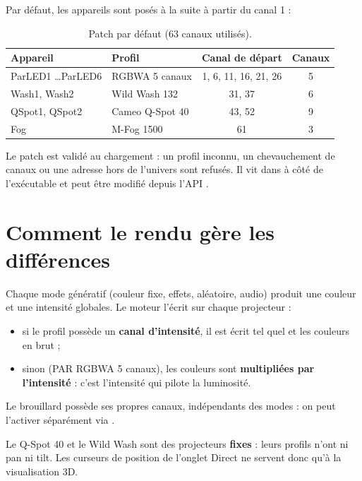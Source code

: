 Par défaut, les appareils sont posés à la suite à partir du canal 1 :

\begin{table}[H]
  \centering
  \begin{tabular}{@{}llcc@{}}
    \toprule
    \textbf{Appareil} & \textbf{Profil} & \textbf{Canal de départ} & \textbf{Canaux} \\
    \midrule
    ParLED1 \dots ParLED6 & RGBWA 5 canaux & 1, 6, 11, 16, 21, 26 & 5 \\
    Wash1, Wash2 & Wild Wash 132 & 31, 37 & 6 \\
    QSpot1, QSpot2 & Cameo Q-Spot 40 & 43, 52 & 9 \\
    Fog & M-Fog 1500 & 61 & 3 \\
    \bottomrule
  \end{tabular}
  \caption{Patch par défaut (63 canaux utilisés).}
  \label{tab:patch}
\end{table}

Le patch est validé au chargement : un profil inconnu, un chevauchement de
canaux ou une adresse hors de l'univers sont refusés. Il vit dans
 à côté de l'exécutable et peut être modifié depuis l'API
.

\section{Comment le rendu gère les différences}

Chaque mode \og{}génératif\fg{} (couleur fixe, effets, aléatoire, audio)
produit une couleur et une intensité globales. Le moteur l'écrit sur chaque
projecteur :

\begin{itemize}[leftmargin=1.4em]
  \item si le profil possède un \textbf{canal d'intensité}, il est écrit tel
        quel et les couleurs en brut ;
  \item sinon (PAR RGBWA 5 canaux), les couleurs sont \textbf{multipliées par
        l'intensité} : c'est l'intensité qui pilote la luminosité.
\end{itemize}

Le brouillard possède ses propres canaux, indépendants des modes : on peut
l'activer séparément via .

\begin{note}
Le Q-Spot 40 et le Wild Wash sont des projecteurs \textbf{fixes} : leurs profils
n'ont ni pan ni tilt. Les curseurs de position de l'onglet Direct ne servent
donc qu'à la visualisation 3D.
\end{note}

